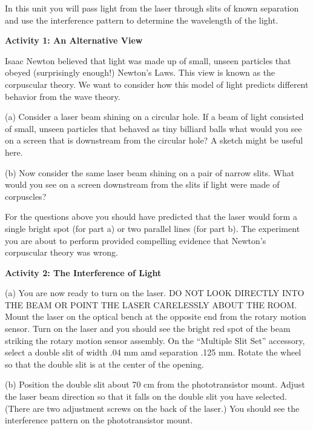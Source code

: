 In this unit you will pass light from the laser through slits of known
separation and use the interference pattern to determine the wavelength
of the light.

\textbf{Activity 1: An Alternative View}

Isaac Newton believed that light was made up of small, unseen particles
that obeyed (surprisingly enough!) Newton's Laws. This view is known
as the corpuscular theory. We want to consider how this model of light
predicts different behavior from the wave theory.

\vspace{35mm}
(a) Consider a laser beam shining on a circular hole. If a beam of
light consisted of small, unseen particles that behaved as tiny billiard
balls what would you see on a screen that is downstream from the circular
hole? A sketch might be useful here.
\vspace{30mm}

(b) Now consider the same laser beam shining on a pair of narrow slits.
What would you see on a screen downstream from the slits if light
were made of corpuscles?
\vspace{30mm}

For the questions above you should have predicted that the laser would
form a single bright spot (for part a) or two parallel lines (for part
b). The experiment you are about to perform provided compelling evidence
that Newton's corpuscular theory was wrong. 

\textbf{Activity 2: The Interference of Light }

(a) You are now ready to turn on the laser. DO NOT LOOK DIRECTLY INTO
THE BEAM OR POINT THE LASER CARELESSLY ABOUT THE ROOM. Mount the laser on the 
optical bench at the opposite end from the rotary motion sensor. Turn on the
laser and you should see the bright red spot of the beam striking
the rotary motion sensor assembly. On the ``Multiple Slit Set'' accessory, 
select a double slit of width .04 mm amd separation .125 mm. Rotate the 
wheel so that the double slit is at the center of the opening.
\vspace{10mm}

(b) Position the double slit about 70 cm from the phototransistor mount. Adjust 
the laser beam direction so that it falls on the double slit you have selected. 
(There are two adjustment screws on the back of the laser.) 
You should see the interference pattern on the phototransistor mount. 
\vspace{10mm}

